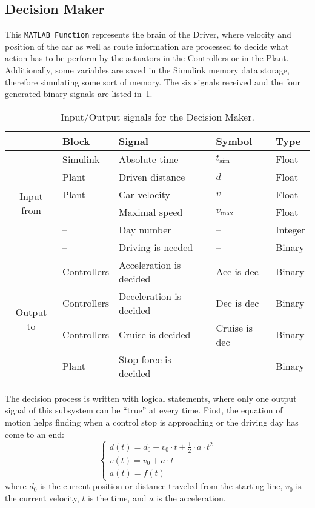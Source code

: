\subsection{Decision Maker}
This \texttt{MATLAB Function} represents the brain of the Driver, where velocity and position of the car as well as route information are processed to decide what action has to be perform by the actuators in the Controllers or in the Plant. Additionally, some variables are saved in the Simulink memory data storage, therefore simulating some sort of memory. The six signals received and the four generated binary signals are listed in~\cref{tab:simInOutDecisionMaker}.
\begin{table}[htbp]
	\centering
	\caption{Input/Output signals for the Decision Maker.}
	\label{tab:simInOutDecisionMaker}
	
	\begin{tabular}{c l l l l}
		\toprule
		& Block & Signal & Symbol & Type \\ 
		\midrule
		\multirow{6}{*}{Input from}
		& Simulink & Absolute time & $t_\mathrm{sim}$ & Float \\
		& Plant & Driven distance & $d$ & Float \\
		& Plant & Car velocity & $v$ & Float \\
		& -- & Maximal speed & $v_\mathrm{max}$ & Float \\
		& -- & Day number & -- & Integer \\
		& -- & Driving is needed & -- & Binary \\
		\midrule
		\multirow{4}{*}{Output to}
		& Controllers & Acceleration is decided & Acc is dec & Binary \\
		& Controllers & Deceleration is decided & Dec is dec & Binary \\
		& Controllers & Cruise is decided & Cruise is dec & Binary \\
		& Plant & Stop force is decided & -- & Binary \\
		\bottomrule
	\end{tabular}
\end{table}

The decision process is written with logical statements, where only one output signal of this subsystem can be \enquote{true} at every time. First, the equation of motion helps finding when a control stop is approaching or the driving day has come to an end:
\begin{equation}
\begin{cases}
	d(t) = d_0 + v_0 \cdot t + \frac{1}{2} \cdot a \cdot t^2 \\
	v(t) = v_0 + a \cdot t \\
	a(t) = f(t)
\end{cases} \label{eq:simEqOfMotion}
\end{equation}
where $d_0$ is the current position or distance traveled from the starting line, $v_0$ is the current velocity, $t$ is the time, and $a$ is the acceleration.

